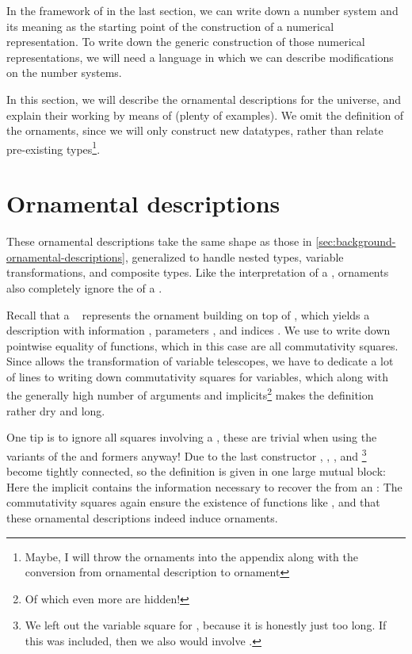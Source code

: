 In the framework of  in the last section, we can write down a number system and its meaning as the starting point of the construction of a numerical representation. To write down the generic construction of those numerical representations, we will need a language in which we can describe modifications on the number systems.

In this section, we will describe the ornamental descriptions for the  universe, and explain their working by means of (plenty of examples). We omit the definition of the ornaments, since we will only construct new datatypes, rather than relate pre-existing types\footnote{Maybe, I will throw the ornaments into the appendix along with the conversion from ornamental description to ornament}.



\section{Ornamental descriptions}
These ornamental descriptions take the same shape as those in \autoref{sec:background-ornamental-descriptions}, generalized to handle nested types, variable transformations, and composite types. Like the interpretation of a , ornaments also completely ignore the  of a .

Recall that a \  represents the ornament building on top of , which yields a description with information , parameters , and indices . We use  to write down pointwise equality of functions, which in this case are all commutativity squares. Since  allows the transformation of variable telescopes, we have to dedicate a lot of lines to writing down commutativity squares for variables, which along with the generally high number of arguments and implicits\footnote{Of which even more are hidden!} makes the definition rather dry and long.

One tip is to  ignore all squares involving a , these are trivial when using the \AV{+-} variants of the  and  formers anyway! Due to the last constructor , , , and \footnote{We left out the variable square for , because it is honestly just too long. If this was included, then we also would involve .} become tightly connected, so the definition is given in one large mutual block:
Here the implicit  contains the information necessary to recover the  from an :
The commutativity squares again ensure the existence of functions like , and that these ornamental descriptions indeed induce ornaments.

